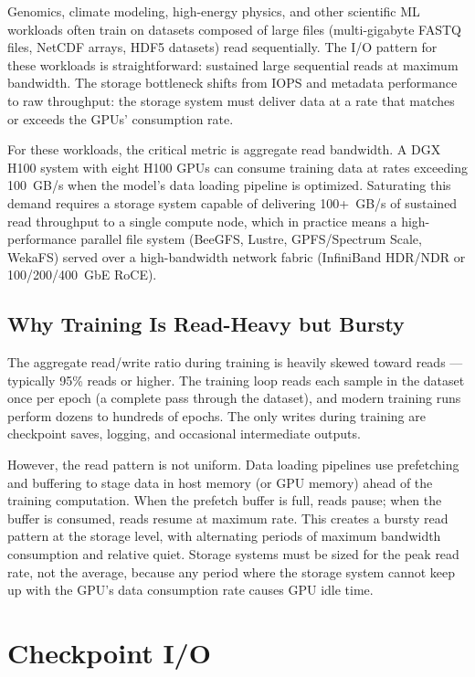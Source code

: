 Genomics, climate modeling, high-energy physics, and other scientific ML
workloads often train on datasets composed of large files (multi-gigabyte
FASTQ files, NetCDF arrays, HDF5 datasets) read sequentially. The I/O pattern
for these workloads is straightforward: sustained large sequential reads at
maximum bandwidth. The storage bottleneck shifts from IOPS and metadata
performance to raw throughput: the storage system must deliver data at a rate
that matches or exceeds the GPUs' consumption rate.

For these workloads, the critical metric is aggregate read bandwidth. A DGX
H100 system with eight H100 GPUs can consume training data at rates exceeding
100~GB/s when the model's data loading pipeline is optimized. Saturating this
demand requires a storage system capable of delivering 100+~GB/s of sustained
read throughput to a single compute node, which in practice means a
high-performance parallel file system (BeeGFS, Lustre, GPFS/Spectrum Scale,
WekaFS) served over a high-bandwidth network fabric (InfiniBand HDR/NDR or
100/200/400~GbE RoCE).

\subsection{Why Training Is Read-Heavy but Bursty}

The aggregate read/write ratio during training is heavily skewed toward reads
--- typically 95\% reads or higher. The training loop reads each sample in the
dataset once per epoch (a complete pass through the dataset), and modern
training runs perform dozens to hundreds of epochs. The only writes during
training are checkpoint saves, logging, and occasional intermediate outputs.

However, the read pattern is not uniform. Data loading pipelines use
prefetching and buffering to stage data in host memory (or GPU memory) ahead
of the training computation. When the prefetch buffer is full, reads pause;
when the buffer is consumed, reads resume at maximum rate. This creates a
bursty read pattern at the storage level, with alternating periods of maximum
bandwidth consumption and relative quiet. Storage systems must be sized for
the peak read rate, not the average, because any period where the storage
system cannot keep up with the GPU's data consumption rate causes GPU idle
time.

\section{Checkpoint I/O}

